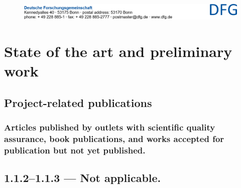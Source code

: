 \documentclass{dfg_en}
\newcommand*{\addtopub}[1]{\addtocategory{publikationen}{#1}\nocite{#1}}
\newcommand*{\addtopubandere}[1]{\addtocategory{publikationen-andere}{#1}\nocite{#1}}
\newcommand{\emptyheading}{ \mdseries--- Not applicable.}
\begin{document}





\begin{figure}[b!]
	\includegraphics[width=\columnwidth]{dfg_address}
\end{figure}
\vspace{1em}


\section{State of the art and preliminary work}
\label{sec:state_of_the_art}



\subsection{Project-related publications}

\subsubsection{Articles published by outlets with scientific quality assurance, book publications, and works accepted for publication but not yet published.}


\subsection*{1.1.2--1.1.3\emptyheading}

%
\end{document}
